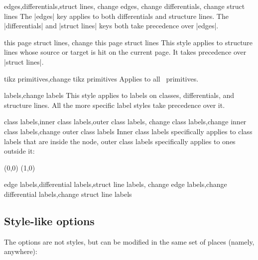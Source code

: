 \begin{sseqdata}[name = basic, cohomological Serre grading]
\begin{stylekeylist}{edges,differentials,struct lines, change edges, change differentials, change struct lines}
The |edges| key applies to both differentials and structure lines. The |differentials| and |struct lines| keys both take precedence over |edges|.
\end{stylekeylist}

\begin{stylekeylist}{this page struct lines, change this page struct lines}
This style applies to structure lines whose source or target is hit on the current page. It takes precedence over |struct lines|.
\end{stylekeylist}

\begin{stylekeylist}{tikz primitives,change tikz primitives}
Applies to all \tikzpkg\  primitives.
\end{stylekeylist}


\begin{stylekeylist}{labels,change labels}
This style applies to labels on classes, differentials, and structure lines. All the more specific label styles take precedence over it.
\end{stylekeylist}

\begin{stylekeylist}{class labels,inner class labels,outer class labels,
                change class labels,change inner class labels,change outer class labels}
Inner class labels specifically applies to class labels that are inside the node, outer class labels specifically applies to ones outside it:
\begin{codeexample}[]
\begin{sseqpage}[ no axes, classes = { inner sep = 1pt },
    label distance=2pt,
    outer class labels = { red },
    inner class labels = { blue } ]
\class["a", "b" above](0,0)
\class["a", "c" right](1,0)
\end{sseqpage}
\end{codeexample}
\end{stylekeylist}

\begin{stylekeylist}{edge labels,differential labels,struct line labels,
                change edge labels,change differential labels,change struct line labels}

\end{stylekeylist}


\subsection{Style-like options}
The options are not styles, but can be modified in the same set of places (namely, anywhere):


\end{sseqdata}
